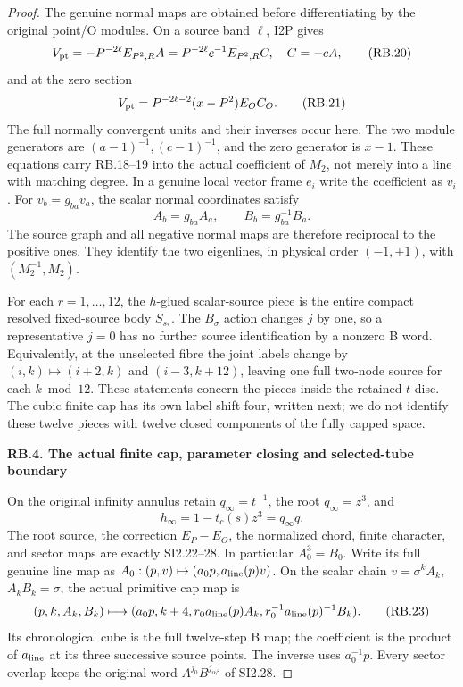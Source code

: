 \begin{proof}
The genuine normal maps are obtained before differentiating by
the original point/O modules. On a source band \(\ell\), I2P gives
\[
 V_{\rm pt}=-P^{-2\ell}E_{P^2,R}A
   =P^{-2\ell}c^{-1}E_{P^2,R}C,\quad C=-cA,
 \tag{RB.20}
\]
and at the zero section
\[
 V_{\rm pt}=P^{-2\ell-2}(x-P^2)E_OC_O.
 \tag{RB.21}
\]
The full normally convergent units and their inverses occur here.
The two module generators are \((a-1)^{-1},(c-1)^{-1}\), and the
zero generator is \(x-1\). These equations carry RB.18--19 into
the actual coefficient of \(M_2\), not merely into a line with
matching degree. In a genuine local vector frame \(e_i\) write
the coefficient as \(v_i\). For \(v_b=g_{ba}v_a\), the scalar
normal coordinates satisfy
\[
 A_b=g_{ba}A_a,\qquad B_b=g_{ba}^{-1}B_a.
 \tag{RB.22}
\]
The source graph and all negative normal maps are therefore
reciprocal to the positive ones. They identify the two eigenlines,
in physical order \((-1,+1)\), with \((M_2^{-1},M_2)\).

For each \(r=1,\ldots,12\), the \(h\)-glued scalar-source piece
is the entire compact resolved fixed-source body \(S_{s_*}\).
The \(B_\sigma\) action changes \(j\) by one, so a representative
\(j=0\) has no further source identification by a nonzero B word.
Equivalently, at the unselected fibre the joint labels change by
\((i,k)\mapsto(i+2,k)\) and \((i-3,k+12)\), leaving one full
two-node source for each \(k\bmod12\). These statements concern
the pieces inside the retained \(t\)-disc. The cubic finite cap
has its own label shift four, written next; we do not identify these
twelve pieces with twelve closed components of the fully capped space.

\par

\medskip\noindent\textbf{RB.4. The actual finite cap, parameter closing and selected-tube boundary}

\par\nobreak

On the original infinity annulus retain \(q_\infty=t^{-1}\), the
root \(q_\infty=z^3\), and
\[
 h_\infty=1-t_c(s)z^3=q_\infty q.
\]
The root source, the correction \(E_P-E_O\), the normalized chord,
finite character, and sector maps are exactly SI2.22--28. In particular
\(A_0^3=B_0\). Write its full genuine line map as
\(A_0:(p,v)\mapsto(a_0p,a_{\rm line}(p)v)\). On the scalar chain
\(v=\sigma^kA_k\), \(A_kB_k=\sigma\), the actual primitive cap map is
\[
 (p,k,A_k,B_k)\longmapsto
 (a_0p,k+4,r_0a_{\rm line}(p)A_k,
                    r_0^{-1}a_{\rm line}(p)^{-1}B_k).
 \tag{RB.23}
\]
Its chronological cube is the full twelve-step B map; the coefficient
is the product of \(a_{\rm line}\) at its three successive source
points. The inverse uses \(a_0^{-1}p\). Every sector overlap keeps
the original word \(A^{j_0}B^{j_{\alpha\beta}}\) of SI2.28.


\end{proof}

